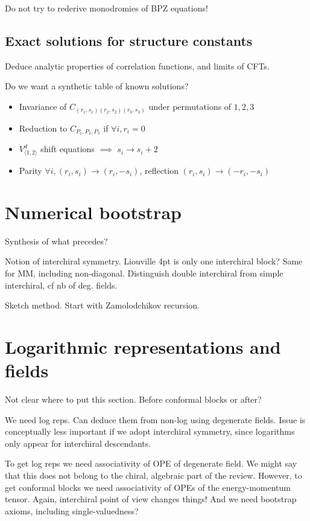 \documentclass[12pt, a4paper]{article}
\theoremstyle{break}
\begin{document}
Do not try to rederive monodromies of BPZ equations! 

\subsection{Exact solutions for structure constants}

Deduce analytic properties of correlation functions, and limits of CFTs. 

Do we want a synthetic table of known solutions? 

\begin{itemize}
\item Invariance of $C_{(r_1,s_1)(r_2,s_2)(r_3,s_3)}$ under permutations of $1,2,3$
\item Reduction to $C_{P_1,P_2,P_3}$ if $\forall i, r_i=0$ 
 \item $V_{\langle 1,2\rangle}^d$ shift equations $\implies$ $s_i\to s_i+2$  
 \item Parity $\forall i, (r_i,s_i)\to (r_i,-s_i)$, reflection $(r_i,s_i)\to (-r_i,-s_i)$
\end{itemize}


\section{Numerical bootstrap}

Synthesis of what precedes?

Notion of interchiral symmetry. Liouville 4pt is only one interchiral block? Same for MM, including non-diagonal. Distinguish double interchiral from simple interchiral, cf nb of deg. fields. 

Sketch method. Start with Zamolodchikov recursion.


\section{Logarithmic representations and fields} \label{sec:log}

Not clear where to put this section. Before conformal blocks or after?

We need log reps. Can deduce them from non-log using degenerate fields. Issue is conceptually less important if we adopt interchiral symmetry, since logarithms only appear for interchiral descendants. 

To get log reps we need associativity of OPE of degenerate field. We might say that this does not belong to the chiral, algebraic part of the review. However, to get conformal blocks we need associativity of OPEs of the energy-momentum tensor. Again, interchiral point of view changes things! And we need bootstrap axioms, including single-valuedness? 
\end{document}
